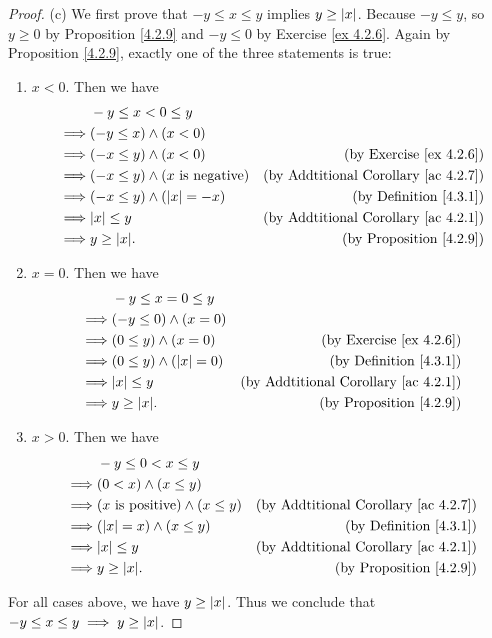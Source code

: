 \begin{proof}{(c)}
We first prove that \(-y \leq x \leq y\) implies \(y \geq \abs*{x}\).
Because \(-y \leq y\), so \(y \geq 0\) by Proposition \ref{4.2.9} and \(-y \leq 0\) by Exercise \ref{ex 4.2.6}.
Again by Proposition \ref{4.2.9}, exactly one of the three statements is true:
\begin{enumerate}[label=(\Roman*)]
    \item \(x < 0\).
    Then we have
    \begin{align*}
        & -y \leq x < 0 \leq y \\
        \implies & (-y \leq x) \land (x < 0) \\
        \implies & (-x \leq y) \land (x < 0) & \text{(by Exercise \ref{ex 4.2.6})} \\
        \implies & (-x \leq y) \land (x \text{ is negative}) & \text{(by Addtitional Corollary \ref{ac 4.2.7})} \\
        \implies & (-x \leq y) \land (\abs*{x} = -x) & \text{(by Definition \ref{4.3.1})} \\
        \implies & \abs*{x} \leq y & \text{(by Addtitional Corollary \ref{ac 4.2.1})} \\
        \implies & y \geq \abs*{x}. & \text{(by Proposition \ref{4.2.9})}
    \end{align*}
    \item \(x = 0\).
    Then we have
    \begin{align*}
        & -y \leq x = 0 \leq y \\
        \implies & (-y \leq 0) \land (x = 0) \\
        \implies & (0 \leq y) \land (x = 0) & \text{(by Exercise \ref{ex 4.2.6})} \\
        \implies & (0 \leq y) \land (\abs*{x} = 0) & \text{(by Definition \ref{4.3.1})} \\
        \implies & \abs*{x} \leq y & \text{(by Addtitional Corollary \ref{ac 4.2.1})} \\
        \implies & y \geq \abs*{x}. & \text{(by Proposition \ref{4.2.9})}
    \end{align*}
    \item \(x > 0\).
    Then we have
    \begin{align*}
        & -y \leq 0 < x \leq y \\
        \implies & (0 < x) \land (x \leq y) \\
        \implies & (x \text{ is positive}) \land (x \leq y) & \text{(by Addtitional Corollary \ref{ac 4.2.7})} \\
        \implies & (\abs*{x} = x) \land (x \leq y) & \text{(by Definition \ref{4.3.1})} \\
        \implies & \abs*{x} \leq y & \text{(by Addtitional Corollary \ref{ac 4.2.1})} \\
        \implies & y \geq \abs*{x}. & \text{(by Proposition \ref{4.2.9})}
    \end{align*}
\end{enumerate}
For all cases above, we have \(y \geq \abs*{x}\).
Thus we conclude that \(-y \leq x \leq y \implies y \geq \abs*{x}\).


\end{proof}
